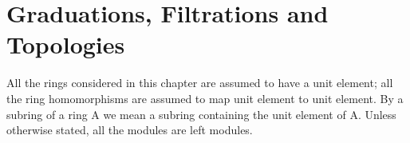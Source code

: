 \chapter{Graduations, Filtrations and Topologies}

All the rings considered in this chapter are assumed to have a unit element; all the ring homomorphisms are assumed to map unit element to unit element. By a subring of a ring A we mean a subring containing the unit element of A. Unless otherwise stated, all the modules are left modules.

